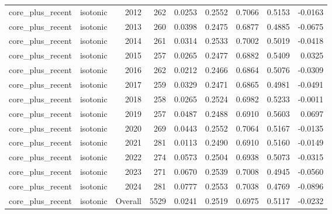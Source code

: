 \begin{table}[t]
\begin{tabular}{@{} l l r r r r r r r @{} }
      core\_plus\_recent & isotonic & 2012 & 262 & 0.0253 & 0.2552 & 0.7066 & 0.5153 & -0.0163 \\
      core\_plus\_recent & isotonic & 2013 & 260 & 0.0398 & 0.2475 & 0.6877 & 0.4885 & -0.0675 \\
      core\_plus\_recent & isotonic & 2014 & 261 & 0.0314 & 0.2533 & 0.7002 & 0.5019 & -0.0418 \\
      core\_plus\_recent & isotonic & 2015 & 257 & 0.0265 & 0.2477 & 0.6882 & 0.5409 & 0.0325 \\
      core\_plus\_recent & isotonic & 2016 & 262 & 0.0212 & 0.2466 & 0.6864 & 0.5076 & -0.0309 \\
      core\_plus\_recent & isotonic & 2017 & 259 & 0.0329 & 0.2471 & 0.6865 & 0.4981 & -0.0491 \\
      core\_plus\_recent & isotonic & 2018 & 258 & 0.0265 & 0.2524 & 0.6982 & 0.5233 & -0.0011 \\
      core\_plus\_recent & isotonic & 2019 & 257 & 0.0487 & 0.2488 & 0.6910 & 0.5603 & 0.0697 \\
      core\_plus\_recent & isotonic & 2020 & 269 & 0.0443 & 0.2552 & 0.7064 & 0.5167 & -0.0135 \\
      core\_plus\_recent & isotonic & 2021 & 281 & 0.0113 & 0.2490 & 0.6910 & 0.5160 & -0.0149 \\
      core\_plus\_recent & isotonic & 2022 & 274 & 0.0573 & 0.2504 & 0.6938 & 0.5073 & -0.0315 \\
      core\_plus\_recent & isotonic & 2023 & 271 & 0.0670 & 0.2539 & 0.7008 & 0.4945 & -0.0560 \\
      core\_plus\_recent & isotonic & 2024 & 281 & 0.0777 & 0.2553 & 0.7038 & 0.4769 & -0.0896 \\
      core\_plus\_recent & isotonic & Overall & 5529 & 0.0241 & 0.2519 & 0.6975 & 0.5117 & -0.0232 \\
    \bottomrule
  \end{tabular}
\end{table}
